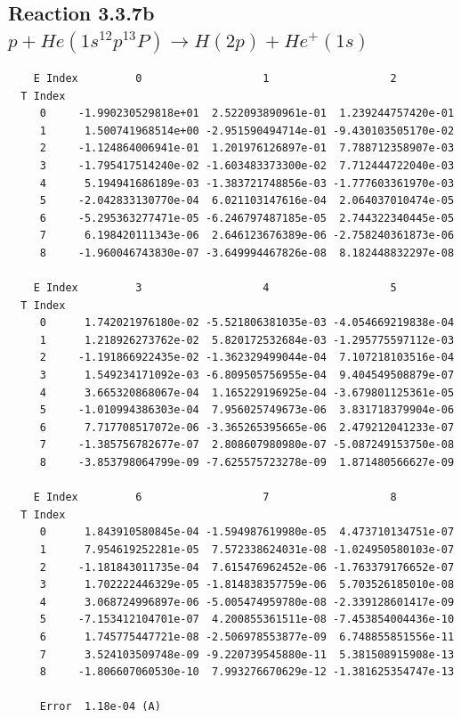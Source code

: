 \documentclass[12pt,dvipdfmx]{article}
\begin{document}
\newpage
\subsection{
Reaction 3.3.7b $  p + He(1s^12p^13P) \rightarrow H(2p) + He^+(1s)$}


\begin{small}\begin{verbatim}
    E Index         0                   1                   2
  T Index
     0     -1.990230529818e+01  2.522093890961e-01  1.239244757420e-01
     1      1.500741968514e+00 -2.951590494714e-01 -9.430103505170e-02
     2     -1.124864006941e-01  1.201976126897e-01  7.788712358907e-03
     3     -1.795417514240e-02 -1.603483373300e-02  7.712444722040e-03
     4      5.194941686189e-03 -1.383721748856e-03 -1.777603361970e-03
     5     -2.042833130770e-04  6.021103147616e-04  2.064037010474e-05
     6     -5.295363277471e-05 -6.246797487185e-05  2.744322340445e-05
     7      6.198420111343e-06  2.646123676389e-06 -2.758240361873e-06
     8     -1.960046743830e-07 -3.649994467826e-08  8.182448832297e-08

    E Index         3                   4                   5
  T Index
     0      1.742021976180e-02 -5.521806381035e-03 -4.054669219838e-04
     1      1.218926273762e-02  5.820172532684e-03 -1.295775597112e-03
     2     -1.191866922435e-02 -1.362329499044e-04  7.107218103516e-04
     3      1.549234171092e-03 -6.809505756955e-04  9.404549508879e-07
     4      3.665320868067e-04  1.165229196925e-04 -3.679801125361e-05
     5     -1.010994386303e-04  7.956025749673e-06  3.831718379904e-06
     6      7.717708517072e-06 -3.365265395665e-06  2.479212041233e-07
     7     -1.385756782677e-07  2.808607980980e-07 -5.087249153750e-08
     8     -3.853798064799e-09 -7.625575723278e-09  1.871480566627e-09

    E Index         6                   7                   8
  T Index
     0      1.843910580845e-04 -1.594987619980e-05  4.473710134751e-07
     1      7.954619252281e-05  7.572338624031e-08 -1.024950580103e-07
     2     -1.181843011735e-04  7.615476962452e-06 -1.763379176652e-07
     3      1.702222446329e-05 -1.814838357759e-06  5.703526185010e-08
     4      3.068724996897e-06 -5.005474959780e-08 -2.339128601417e-09
     5     -7.153412104701e-07  4.200855361511e-08 -7.453854004436e-10
     6      1.745775447721e-08 -2.506978553877e-09  6.748855851556e-11
     7      3.524103509748e-09 -9.220739545880e-11  5.381508915908e-13
     8     -1.806607060530e-10  7.993276670629e-12 -1.381625354747e-13

     Error  1.18e-04 (A)
\end{verbatim}\end{small}
\end{document}
